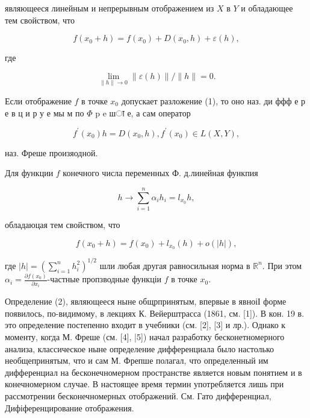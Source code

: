 \documentclass[10pt]{article}
\begin{document}
являющееся линейным и непрерывным отображением из $X$ в $Y$ и обладающее тем свойством, что



\[

f\left(x_{0}+h\right)=f\left(x_{0}\right)+D\left(x_{0}, h\right)+\varepsilon(h),

\]



где



\[

\lim _{\|h\| \rightarrow 0}\|\varepsilon(h)\| /\|h\|=0 .

\]



Если отображение $f$ в точке $x_{0}$ допускает разложение (1), то оно наз. ди ффф е р е в ц и р у е мы м по $\Phi$ p e шा е, а сам оператор



\[

f^{\prime}\left(x_{0}\right) h=D\left(x_{0}, h\right), f^{\prime}\left(x_{0}\right) \in L(X, Y),

\]



наз. Фреше произяодной.



Для функции $f$ конечного числа переменных Ф. д.линейная функпия



\[

h \rightarrow \sum_{i=1}^{n} \alpha_{i} h_{i}=l_{x_{0}} h,

\]



обладаюцая тем свойством, что



\[

f\left(x_{0}+h\right)=f\left(x_{0}\right)+l_{x_{0}}(h)+o(|h|),

\]



где $|h|=\left(\sum_{i=1}^{n} h_{i}^{2}\right)^{1 / 2}$ шли любая другая равносильная норма в $\mathbb{R}^{n}$. При этом $\alpha_{i}=\frac{\partial f\left(x_{0}\right)}{\partial x_{i}}$-частные пропзводные функціи $f$ в точке $x_{0}$.



Определение (2), являющееся ныне общрпринятым, впервые в явноіІ форме появилось, по-видимому, в лекциях К. Вейерштрасса (1861, см. [1]). В кон. 19 в. это определение постепенно входит в учебники (см. [2], [3] и лр.). Однако к моменту, когда М. Фреше (см. [4], |5]) начал разработку бесконетномерного анализа, классическое ныне определение дифференциала было настолько необщепринятым, что и сам М. Фрепше полагал, что определенный им дифференциал на бесконечномерном пространстве является новым понятием и в конечномерном случае. В настоящее время термин употребляется лишь при рассмотрении бесконечномерных отображений. См. Гато дифференциал, Дифіференцирование отображения.
\end{document}
